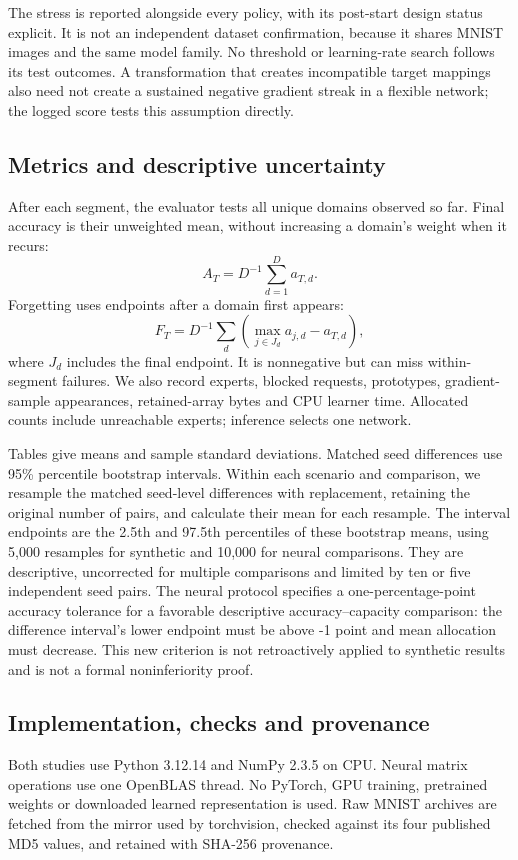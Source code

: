 The stress is reported alongside every policy, with its post-start design status explicit. It is not an independent dataset confirmation, because it shares MNIST images and the same model family. No threshold or learning-rate search follows its test outcomes. A transformation that creates incompatible target mappings also need not create a sustained negative gradient streak in a flexible network; the logged score tests this assumption directly.

\subsection{Metrics and descriptive uncertainty}
After each segment, the evaluator tests all unique domains observed so far. Final accuracy is their unweighted mean, without increasing a domain's weight when it recurs:
\begin{equation}
A_T=D^{-1}\sum_{d=1}^D a_{T,d}.
\end{equation}
Forgetting uses endpoints after a domain first appears:
\begin{equation}
F_T=D^{-1}\sum_d\left(\max_{j\in J_d}a_{j,d}-a_{T,d}\right),
\end{equation}
where \(J_d\) includes the final endpoint. It is nonnegative but can miss within-segment failures. We also record experts, blocked requests, prototypes, gradient-sample appearances, retained-array bytes and CPU learner time. Allocated counts include unreachable experts; inference selects one network.

Tables give means and sample standard deviations. Matched seed differences use 95\% percentile bootstrap intervals. Within each scenario and comparison, we resample the matched seed-level differences with replacement, retaining the original number of pairs, and calculate their mean for each resample. The interval endpoints are the 2.5th and 97.5th percentiles of these bootstrap means, using 5,000 resamples for synthetic and 10,000 for neural comparisons. They are descriptive, uncorrected for multiple comparisons and limited by ten or five independent seed pairs. The neural protocol specifies a one-percentage-point accuracy tolerance for a favorable descriptive accuracy--capacity comparison: the difference interval's lower endpoint must be above -1 point and mean allocation must decrease. This new criterion is not retroactively applied to synthetic results and is not a formal noninferiority proof.

\subsection{Implementation, checks and provenance}
Both studies use Python 3.12.14 and NumPy 2.3.5 on CPU. Neural matrix operations use one OpenBLAS thread. No PyTorch, GPU training, pretrained weights or downloaded learned representation is used. Raw MNIST archives are fetched from the mirror used by torchvision, checked against its four published MD5 values, and retained with SHA-256 provenance.


